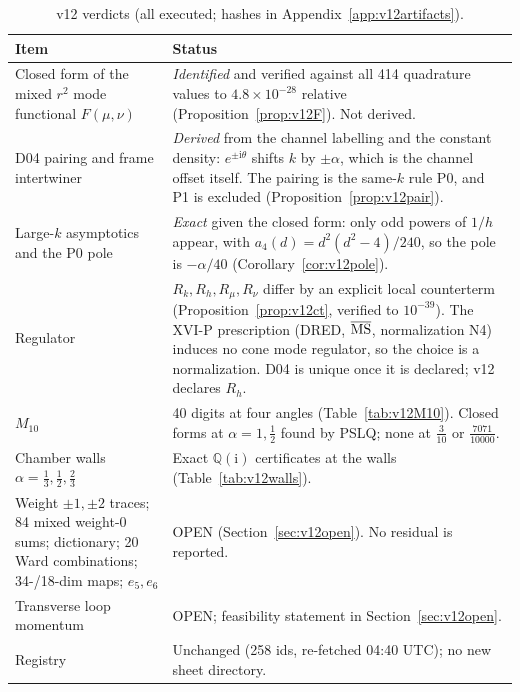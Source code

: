 \documentclass[11pt,a4paper]{article}
\newcommand{\ii}{\mathrm i}
\newcommand{\OPEN}{\textsf{OPEN}}
\theoremstyle{plain}
\theoremstyle{definition}
\theoremstyle{remark}
\numberwithin{equation}{section}
\begin{document}
\begin{center}
\small
\begin{longtable}{@{}L{.30\linewidth}L{.62\linewidth}@{}}
\caption{v12 verdicts (all executed; hashes in Appendix~\ref{app:v12artifacts}).}\label{tab:v12verdict}\\
\toprule
Item & Status\\
\midrule
Closed form of the mixed \(r^2\) mode functional \(F(\mu,\nu)\) & \emph{Identified} and verified against all 414 quadrature values to \(4.8\times10^{-28}\) relative (Proposition~\ref{prop:v12F}). Not derived.\\
D04 pairing and frame intertwiner & \emph{Derived} from the channel labelling and the constant density: \(e^{\pm\ii\theta}\) shifts \(k\) by \(\pm\alpha\), which is the channel offset itself. The pairing is the same-\(k\) rule P0, and P1 is excluded (Proposition~\ref{prop:v12pair}).\\
Large-\(k\) asymptotics and the P0 pole & \emph{Exact} given the closed form: only odd powers of \(1/h\) appear, with \(a_4(d)=d^2(d^2-4)/240\), so the pole is \(-\alpha/40\) (Corollary~\ref{cor:v12pole}).\\
Regulator & \(R_k,R_h,R_\mu,R_\nu\) differ by an explicit local counterterm (Proposition~\ref{prop:v12ct}, verified to \(10^{-39}\)). The XVI-P prescription (DRED, \(\overline{\rm MS}\), normalization N4) induces no cone mode regulator, so the choice is a normalization. D04 is unique once it is declared; v12 declares \(R_h\).\\
\(M_{10}\) & 40 digits at four angles (Table~\ref{tab:v12M10}). Closed forms at \(\alpha=1,\tfrac12\) found by PSLQ; none at \(\tfrac3{10}\) or \(\tfrac{7071}{10000}\).\\
Chamber walls \(\alpha=\tfrac13,\tfrac12,\tfrac23\) & Exact \(\mathbb Q(\ii)\) certificates at the walls (Table~\ref{tab:v12walls}).\\
Weight \(\pm1,\pm2\) traces; 84 mixed weight-0 sums; dictionary; 20 Ward combinations; 34-/18-dim maps; \(e_5,e_6\) & \OPEN{} (Section~\ref{sec:v12open}). No residual is reported.\\
Transverse loop momentum & \OPEN; feasibility statement in Section~\ref{sec:v12open}.\\
Registry & Unchanged (258 ids, re-fetched 04:40 UTC); no new sheet directory.\\
\bottomrule
\end{longtable}
\end{center}

\end{document}
